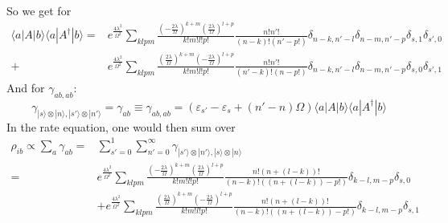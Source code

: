 	So we get for
	\begin{align*}
		\langle a | A | b \rangle \langle a | A^\dagger | b\rangle =&	e^{\frac{4\lambda^2}{\Omega^2}} \sum_{klpm} \frac{\left(-\frac{2\lambda}{\Omega}\right)^{k+m} \left(\frac{2 \lambda}{\Omega} \right)^{l+p}}{k!m! l!p!} \frac{n!n'!}{(n-k)! (n'-p!)} \delta_{n-k, n'-l} \delta_{n-m, n'-p} \delta_{s,1} \delta_{s', 0} \\
		+& e^{\frac{4\lambda^2}{\Omega^2}} \sum_{klpm} \frac{\left(\frac{2\lambda}{\Omega}\right)^{k+m} \left(-\frac{2 \lambda}{\Omega} \right)^{l+p}}{k!m! l!p!} \frac{n!n'!}{(n'-k)! (n-p!)} \delta_{n-k, n'-l} \delta_{n-m, n'-p} \delta_{s,0} \delta_{s', 1}
	\end{align*}
	And for $\gamma_{ab, ab}$:
	\begin{equation}
		\gamma_{|s\rangle \otimes |n\rangle, |s' \rangle \otimes |n'\rangle } =	\gamma_{ab} \equiv \gamma_{ab, ab} = (\varepsilon_{s'} - \varepsilon_{s} + (n' -n) \Omega) \langle a | A | b \rangle \langle a | A^\dagger | b\rangle
	\end{equation}
	In the rate equation, one would then sum over
	\begin{align}
		\rho_{ib} \propto \sum_a \gamma_{ab} =&	\sum_{s'=0}^{1} \sum_{n'=0}^{\infty}  	\gamma_{|s'\rangle \otimes |n'\rangle, |s \rangle \otimes |n\rangle } \\
		=& 	e^{\frac{4\lambda^2}{\Omega^2}} \sum_{klpm} \frac{\left(-\frac{2\lambda}{\Omega}\right)^{k+m} \left(\frac{2 \lambda}{\Omega} \right)^{l+p}}{k!m! l!p!} \frac{n!(n + (l-k))!}{(n-k)! ((n + (l-k))-p!)} \delta_{k-l, m-p} \delta_{s, 0} \\
		&+ e^{\frac{4\lambda^2}{\Omega^2}} \sum_{klpm} \frac{\left(\frac{2\lambda}{\Omega}\right)^{k+m} \left(-\frac{2 \lambda}{\Omega} \right)^{l+p}}{k!m! l!p!} \frac{n!(n + (l-k))!}{(n-k)! ((n + (l-k))-p!)} \delta_{k-l, m- p}  \delta_{s,1}
	\end{align}
